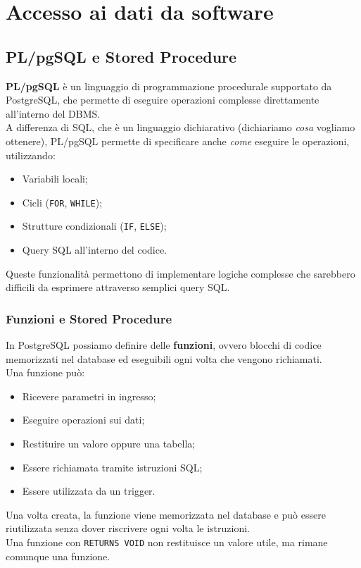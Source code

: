 \chapter{Accesso ai dati da software}

\section{PL/pgSQL e Stored Procedure}
\textbf{PL/pgSQL} è un linguaggio di programmazione procedurale
supportato da PostgreSQL, che permette di eseguire operazioni
complesse direttamente all'interno del DBMS.\\
A differenza di SQL, che è un linguaggio dichiarativo
(dichiariamo \textit{cosa} vogliamo ottenere), PL/pgSQL
permette di specificare anche \textit{come} eseguire
le operazioni, utilizzando:
\begin{itemize}
    \item Variabili locali;
    \item Cicli (\texttt{FOR}, \texttt{WHILE});
    \item Strutture condizionali (\texttt{IF}, \texttt{ELSE});
    \item Query SQL all'interno del codice.
\end{itemize}
\noindent Queste funzionalità permettono di implementare logiche
complesse che sarebbero difficili da esprimere
attraverso semplici query SQL.
\subsection{Funzioni e Stored Procedure}
In PostgreSQL possiamo definire delle \textbf{funzioni},
ovvero blocchi di codice memorizzati nel database
ed eseguibili ogni volta che vengono richiamati.\\
Una funzione può:
\begin{itemize}
    \item Ricevere parametri in ingresso;
    \item Eseguire operazioni sui dati;
    \item Restituire un valore oppure una tabella;
    \item Essere richiamata tramite istruzioni SQL;
    \item Essere utilizzata da un trigger.
\end{itemize}
\noindent Una volta creata, la funzione viene memorizzata
nel database e può essere riutilizzata senza
dover riscrivere ogni volta le istruzioni.\\
Una funzione con \texttt{RETURNS VOID} non restituisce
un valore utile, ma rimane comunque una funzione.
